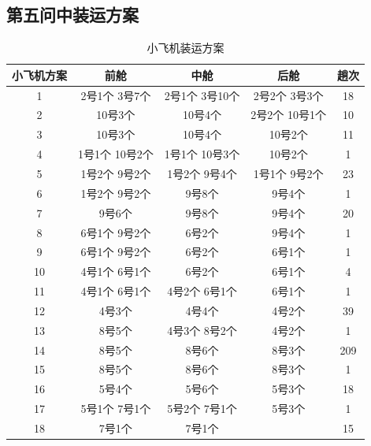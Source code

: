 \documentclass{article}
\begin{document}
	\newpage
	\subsection{第五问中装运方案}
	\begin{table}[!h]
		\centering
		\caption{小飞机装运方案}
		\begin{tabular}{|c|c|c|c|c|}
			\hline
			小飞机方案 & 前舱         & 中舱         & 后舱         & 趟次  \\ \hline
			1     & 2号1个 3号7个  & 2号1个 3号10个 & 2号2个 3号3个  & 18  \\ \hline
			2     & 10号3个      & 10号4个      & 2号2个 10号1个 & 10  \\ \hline
			3     & 10号3个      & 10号4个      & 10号2个      & 11  \\ \hline
			4     & 1号1个 10号2个 & 1号1个 10号3个 & 10号2个      & 1   \\ \hline
			5     & 1号2个 9号2个  & 1号2个 9号4个  & 1号1个 9号2个  & 23  \\ \hline
			6     & 1号2个 9号2个  & 9号8个       & 9号4个       & 1   \\ \hline
			7     & 9号6个       & 9号8个       & 9号4个       & 20  \\ \hline
			8     & 6号1个 9号2个  & 6号2个       & 9号4个       & 1   \\ \hline
			9     & 6号1个 9号2个  & 6号2个       & 6号1个       & 1   \\ \hline
			10    & 4号1个 6号1个  & 6号2个       & 6号1个       & 4   \\ \hline
			11    & 4号1个 6号1个  & 4号2个 6号1个  & 6号1个       & 1   \\ \hline
			12    & 4号3个       & 4号4个       & 4号2个       & 39  \\ \hline
			13    & 8号5个       & 4号3个 8号2个  & 4号2个       & 1   \\ \hline
			14    & 8号5个       & 8号6个       & 8号3个       & 209 \\ \hline
			15    & 8号5个       & 8号6个       & 8号3个       & 1   \\ \hline
			16    & 5号4个       & 5号6个       & 5号3个       & 18  \\ \hline
			17    & 5号1个 7号1个  & 5号2个 7号1个  & 5号3个       & 1   \\ \hline
			18    & 7号1个       & 7号1个       &            & 15  \\ \hline
		\end{tabular}
	\end{table}
	
\end{document}
